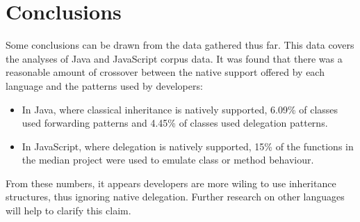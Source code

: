 \chapter{Conclusions}\label{C:con}
Some conclusions can be drawn from the data gathered thus far. This data covers the analyses of Java and JavaScript corpus data. It was found that there was a reasonable amount of crossover between the native support offered by each language and the patterns used by developers:
\begin{itemize}
	\item In Java, where classical inheritance is natively supported, 6.09\% of classes used forwarding patterns and 4.45\% of classes used delegation patterns.
	\item In JavaScript, where delegation is natively supported, 15\% of the functions in the median project were used to emulate class or method behaviour.
\end{itemize}
From these numbers, it appears developers are more wiling to use inheritance structures,  thus ignoring native delegation. Further research on other languages will help to clarify this claim.